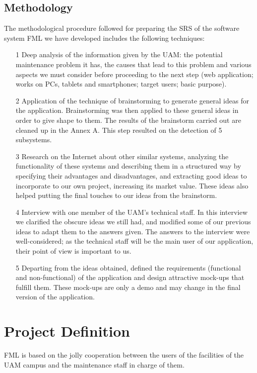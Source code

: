 \documentclass{report}
\begin{document}
\section{Methodology}

The methodological procedure followed for preparing the SRS of the software system FML we have developed includes the following techniques:
\begin{itemize}
\item[1] Deep analysis of the information given by the UAM: the potential maintenance problem it has, the causes that lead to this problem and various aspects we must consider before proceeding to the next step (web application;  works on PCs, tablets and smartphones; target users; basic purpose).
\item[2] Application of the technique of brainstorming to generate general ideas for the application. Brainstorming was then applied to these general ideas in order to give shape to them. The results of the brainstorm carried out are cleaned up in the Annex A. This step resulted on the detection of 5 subsystems.
\item[3] Research on the Internet about other similar systems, analyzing the functionality of these systems and describing them in a structured way by specifying their advantages and disadvantages, and extracting good ideas to incorporate to our own project, increasing its market value. These ideas also helped putting the final touches to our ideas from the brainstorm.
\item[4] Interview with one member of the UAM's technical staff. In this interview we clarified the obscure ideas we still had, and modified some of our previous ideas to adapt them to the answers given. The answers to the interview were well-considered; as the technical staff will be the main user of our application, their point of view is important to us.
\item[5] Departing from the ideas obtained, defined the requirements (functional and non-functional) of the application and design attractive mock-ups that fulfill them. These mock-ups are only a demo and may change in the final version of the application.
\end{itemize}

\chapter{Project Definition}

FML is based on the jolly cooperation between the users of the facilities of the UAM campus and the maintenance staff in charge of them.
\end{document}
